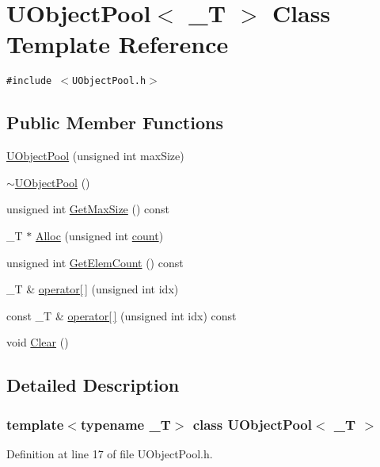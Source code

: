 \hypertarget{class_u_object_pool}{
\section{UObjectPool$<$ \_\-T $>$ Class Template Reference}
\label{class_u_object_pool}
}
{\tt \#include $<$UObjectPool.h$>$}

\subsection*{Public Member Functions}
\begin{CompactItemize}
\item 
\hyperlink{class_u_object_pool_bfb3ded5de6f776873e89fb45b6eb3af}{UObjectPool} (unsigned int maxSize)
\item 
\hyperlink{class_u_object_pool_d7d7c446edb058e7af78972484cfcb0e}{$\sim$UObjectPool} ()
\item 
unsigned int \hyperlink{class_u_object_pool_92c0aee06f904b8e7cccbde28ff2d6db}{GetMaxSize} () const 
\item 
\_\-T $\ast$ \hyperlink{class_u_object_pool_b86f0a98406e5ee01a521a8cb9a08dff}{Alloc} (unsigned int \hyperlink{wglext_8h_98d18d6b4e3ba4ed266c6fb54c839d70}{count})
\item 
unsigned int \hyperlink{class_u_object_pool_104b7acdc7af85dd670a32dda060f218}{GetElemCount} () const 
\item 
\_\-T \& \hyperlink{class_u_object_pool_200586a36693e4318c776ce133ce8354}{operator\mbox{[}$\,$\mbox{]}} (unsigned int idx)
\item 
const \_\-T \& \hyperlink{class_u_object_pool_f7cb9d7a1acc4f58bdb05f47cdbb2129}{operator\mbox{[}$\,$\mbox{]}} (unsigned int idx) const 
\item 
void \hyperlink{class_u_object_pool_3ae271d5b90ef0dcc678f35cfb4e41e0}{Clear} ()
\end{CompactItemize}


\subsection{Detailed Description}
\subsubsection*{template$<$typename \_\-T$>$ class UObjectPool$<$ \_\-T $>$}



Definition at line 17 of file UObjectPool.h.

